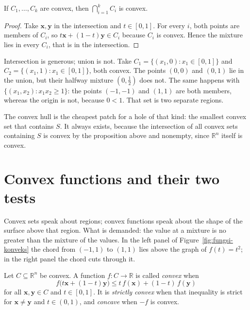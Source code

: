 \begin{proposisi}
If $C_{1},\dots,C_{k}$ are convex, then $\bigcap_{i=1}^{k}C_{i}$ is convex.
\end{proposisi}

\begin{proof}
Take $\mathbf{x},\mathbf{y}$ in the intersection and $t\in[0,1]$. For every $i$, both points
are members of $C_{i}$, so $t\mathbf{x}+(1-t)\mathbf{y}\in C_{i}$ because $C_{i}$ is convex.
Hence the mixture lies in every $C_{i}$, that is in the intersection.
\end{proof}

Intersection is generous; union is not. Take $C_{1}=\{(x_{1},0):x_{1}\in[0,1]\}$ and
$C_{2}=\{(x_{1},1):x_{1}\in[0,1]\}$, both convex. The points $(0,0)$ and $(0,1)$ lie in the
union, but their halfway mixture $(0,\tfrac12)$ does not. The same happens with
$\{(x_{1},x_{2}):x_{1}x_{2}\ge1\}$: the points $(-1,-1)$ and $(1,1)$ are both members,
whereas the origin is not, because $0<1$. That set is two separate regions.

The convex hull is the cheapest patch for a hole of that kind: the smallest convex set that
contains $S$. It always exists, because the intersection of all convex sets containing $S$ is
convex by the proposition above and nonempty, since $\mathbb{R}^{n}$ itself is convex.

\section{Convex functions and their two tests}

Convex sets speak about regions; convex functions speak about the shape of the surface above
that region. What is demanded: the value at a mixture is no greater than the mixture of the
values. In the left panel of Figure~\ref{fig:fungsi-konveks} the chord from $(-1,1)$ to
$(1,1)$ lies above the graph of $f(t)=t^{2}$; in the right panel the chord cuts through it.


\begin{definisi}
Let $C\subseteq\mathbb{R}^{n}$ be convex. A function $f\colon C\to\mathbb{R}$ is called
\emph{convex} when
\[
  f\bigl(t\mathbf{x}+(1-t)\mathbf{y}\bigr)
  \le t\,f(\mathbf{x})+(1-t)\,f(\mathbf{y})
\]
for all $\mathbf{x},\mathbf{y}\in C$ and $t\in[0,1]$. It is \emph{strictly convex} when that
inequality is strict for $\mathbf{x}\ne\mathbf{y}$ and $t\in(0,1)$, and \emph{concave} when
$-f$ is convex.
\end{definisi}

